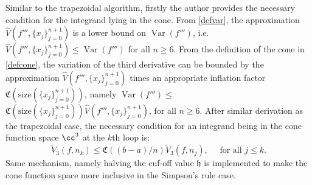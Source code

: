 \documentclass{iitthesis}
\DeclareMathOperator{\Var}{Var}
\theoremstyle{definition}
\theoremstyle{remark}
\begin{document}
Similar to the trapezoidal algorithm, firstly the author provides the necessary condition for the integrand lying in the cone. From \eqref{defvar}, the approximation $\widehat{V}({f'''},\{x_j\}_{j=0}^{n+1})$ is a lower bound on $\Var({f'''})$, i.e. $\widehat{V}({f'''},\{x_j\}_{j=0}^{n+1})\leq \Var({f'''})$ for all $n \ge 6$. From the definition of the cone in \eqref{defcone}, the variation of the third derivative can be bounded by the approximation $\widehat{V}({f'''},\{x_j\}_{j=0}^{n+1})$ times an appropriate inflation factor $\mathfrak{C}(\text{size}(\{x_j\}_{j=0}^{n+1}))$, namely $\Var({f'''})\leq$$\mathfrak{C}(\text{size}(\{x_j\}_{j=0}^{n+1}))\widehat{V}({f'''},\{x_j\}_{j=0}^{n+1})$, for all $n \ge 6$. After similar derivation as the trapezoidal case, the necessary condition for an integrand being in the cone function space $\cc^3$ at the $k$th loop is:
\begin{equation}\label{necconsim}
    \widetilde{V}_3(f,n_k)\leq\mathfrak{C}((b-a)/n)\widetilde{V}_3(f,n_j), \quad \text{ for all } j \leq k.
\end{equation}
Same mechanism, namely halving the cuf-off value $\mathfrak{h}$ is implemented to make the cone function space more inclusive in the Simpson's rule case.
\end{document}
